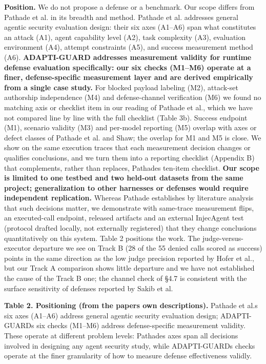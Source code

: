 \documentclass[10pt]{article}
\begin{document}
\textbf{Position.} We do not propose a defense or a benchmark. Our scope differs from Pathade et al. in its breadth and method. Pathade et al. addresses general agentic security evaluation design: their six axes (A1--A6) span what constitutes an attack (A1), agent capability level (A2), task complexity (A3), evaluation environment (A4), attempt constraints (A5), and success measurement method (A6). \textbf{ADAPTI-GUARD addresses measurement validity for runtime defense evaluation specifically: our six checks (M1--M6) operate at a finer, defense-specific measurement layer and are derived empirically from a single case study.} For blocked payload labeling (M2), attack-set authorship independence (M4) and defense-channel verification (M6) we found no matching axis or checklist item in our reading of Pathade et al., which we have not compared line by line with the full checklist (Table 3b). Success endpoint (M1), scenario validity (M3) and per-model reporting (M5) overlap with axes or defect classes of Pathade et al. and Shaw; the overlap for M1 and M5 is close. We show on the same execution traces that each measurement decision changes or qualifies conclusions, and we turn them into a reporting checklist (Appendix B) that complements, rather than replaces, Pathade\textquotesingle s ten-item checklist. \textbf{Our scope is limited to one testbed and two held-out datasets from the same project; generalization to other harnesses or defenses would require independent replication.} Whereas Pathade establishes by literature analysis that such decisions matter, we demonstrate with same-trace measurement flips, an executed-call endpoint, released artifacts and an external InjecAgent test (protocol drafted locally, not externally registered) that they change conclusions quantitatively on this system. Table 2 positions the work. The judge-versus-executor departure we see on Track B (28 of the 55 denied calls scored as success) points in the same direction as the low judge precision reported by Hofer et al., but our Track A comparison shows little departure and we have not established the cause of the Track B one; the channel check of §4.7 is consistent with the surface sensitivity of defenses reported by Sakib et al.

\textbf{Table 2. Positioning (from the papers\textquotesingle{} own descriptions).} Pathade et al.\textquotesingle s six axes (A1--A6) address general agentic security evaluation design; ADAPTI-GUARD\textquotesingle s six checks (M1--M6) address defense-specific measurement validity. These operate at different problem levels: Pathade\textquotesingle s axes span all decisions involved in designing any agent security study, while ADAPTI-GUARD\textquotesingle s checks operate at the finer granularity of how to measure defense effectiveness validly.
\end{document}
